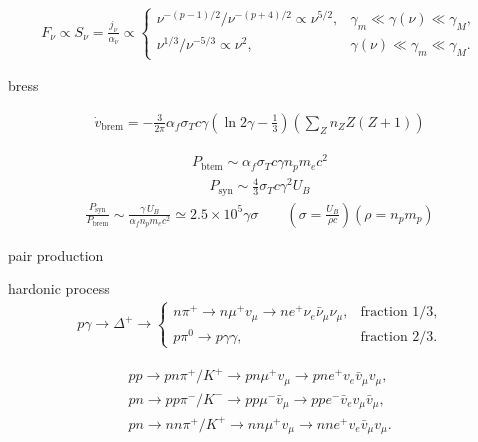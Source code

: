 \documentclass{article}
\begin{document}
\begin{align*}
    F_\nu \propto S_\nu = \frac{j_\nu}{\alpha_\nu} \propto \begin{cases}
                                                       \nu^{-(p-1)/2}/\nu^{-(p+4)/2} \propto \nu^{5/2}, & \gamma_m \ll \gamma(\nu) \ll \gamma_M, \\
                                                       \nu^{1/3}/\nu^{-5/3} \propto \nu^2,              & \gamma(\nu) \ll \gamma_m \ll \gamma_M.
                                                   \end{cases}
\end{align*}

bress

\begin{align*}
    \dot{v}_{\text{brem}} = -\frac{3}{2\pi} \alpha_f \sigma_T c \gamma \left( \ln 2\gamma - \frac{1}{3} \right) \left( \sum_Z n_Z Z(Z + 1) \right)
\end{align*}

\begin{align*}
    P_{\text{btem}} \sim \alpha_f \sigma_T c \gamma n_p m_e c^2
\end{align*}
\begin{align*}
    P_{\text{syn}} \sim \frac{4}{3} \sigma_T c \gamma^2 U_B
\end{align*}
\begin{align*}
    \frac{P_{\text{syn}}}{P_{\text{brem}}} \sim \frac{\gamma \, U_B}{\alpha_f n_p m_e c^2} \simeq 2.5 \times 10^5 \gamma \sigma \qquad (\sigma=\frac{U_B}{\rho c}) (\rho = n_p m_p)
\end{align*}

pair production



hardonic process
\begin{align*}
    p \gamma \to \Delta^+ \to \begin{cases}
                                  n \pi^{+} \to n \mu^{+} v_\mu \to n e^{+} \nu_e \bar{\nu}_\mu \nu_\mu, & \text{fraction 1/3}, \\
                                  p \pi^0 \to p \gamma \gamma,                                           & \text{fraction 2/3}.
                              \end{cases}
\end{align*}

\begin{align*}
    pp \to pn\pi^+/K^+ \to pn\mu^+ v_\mu \to pne^+ v_e \bar{v}_\mu v_\mu,             \\
    pn \to pp\pi^-/K^- \to pp\mu^- \bar{v}_\mu \to ppe^- \bar{v}_e v_\mu \bar{v}_\mu, \\
    pn \to nn\pi^+/K^+ \to nn\mu^+ v_\mu \to nne^+ v_e \bar{v}_\mu v_\mu.
\end{align*}
\end{document}
